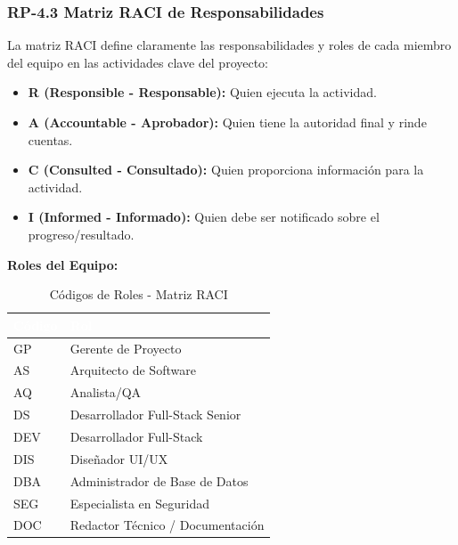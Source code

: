 \documentclass[12pt,a4paper]{article}
\begin{document}
\subsubsection{RP-4.3 Matriz RACI de Responsabilidades}

La matriz RACI define claramente las responsabilidades y roles de cada miembro del equipo en las actividades clave del proyecto:

\begin{itemize}[noitemsep]
    \item \textbf{R (Responsible - Responsable):} Quien ejecuta la actividad.
    \item \textbf{A (Accountable - Aprobador):} Quien tiene la autoridad final y rinde cuentas.
    \item \textbf{C (Consulted - Consultado):} Quien proporciona información para la actividad.
    \item \textbf{I (Informed - Informado):} Quien debe ser notificado sobre el progreso/resultado.
\end{itemize}

\textbf{Roles del Equipo:}

\begin{table}[h]
\centering
\begin{tabular}{|>{\centering\arraybackslash}p{2cm}|>{\raggedright\arraybackslash}p{8cm}|}
\hline
\rowcolor{headerblue}
\textcolor{white}{\textbf{Código}} & \textcolor{white}{\textbf{Rol}} \\
\hline
GP & Gerente de Proyecto \\
\hline
\rowcolor{rowgray}
AS & Arquitecto de Software \\
\hline
AQ & Analista/QA \\
\hline
\rowcolor{rowgray}
DS & Desarrollador Full-Stack Senior \\
\hline
DEV & Desarrollador Full-Stack \\
\hline
\rowcolor{rowgray}
DIS & Diseñador UI/UX \\
\hline
DBA & Administrador de Base de Datos \\
\hline
\rowcolor{rowgray}
SEG & Especialista en Seguridad \\
\hline
DOC & Redactor Técnico / Documentación \\
\hline
\end{tabular}
\caption{Códigos de Roles - Matriz RACI}
\end{table}

\clearpage
\end{document}
